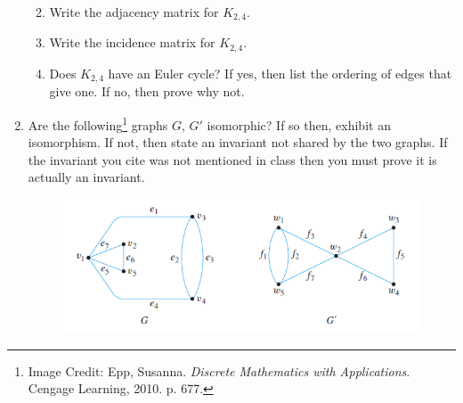 \documentclass[12pt,letterpaper]{article}
\begin{document}
\begin{enumerate}
\begin{enumerate}
\vspace{12pc}
\item Write the adjacency matrix for $K_{2,4}$.

\vspace{12pc}
\item Write the incidence matrix for $K_{2,4}$.

\vspace{12pc}
\item Does $K_{2,4}$ have an Euler cycle?  If yes, then list the ordering of edges that give one.  If no, then prove why not.

\end{enumerate}


\newpage
\item Are the following\footnote{Image Credit: Epp, Susanna. {\it Discrete Mathematics with Applications}.  Cengage Learning, 2010.  p. 677.} graphs $G$, $G'$ isomorphic?  If so then, exhibit an isomorphism.  If not, then state an invariant not shared by the two graphs.  If the invariant you cite was not mentioned in class then you must prove it is actually an invariant.  
\vspace{-1pc}  
\begin{figure}[h]
\begin{center}
\includegraphics*[scale=0.9]{Exam3EppIso.png}
\end{center}
\end{figure}


\end{enumerate}
\end{document}
